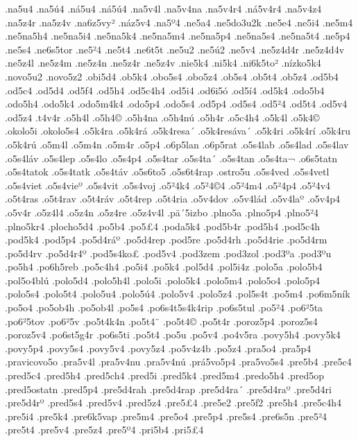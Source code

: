 {.na5u4
.na5^^fa4
.n^^e15u4
.n^^e15^^fa4
.na5v4l
.na5v4na
.na5v4r4
.n^^e15v4r4
.na5v4z4
.na5z4r
.na5z4v
.na6z5vy^^b2
.n^^e1z5v4
.na5^^ba4
.ne5a4
.ne5do3u2k
.ne5e4
.ne5i4
.ne5m4
.ne5na5h4
.ne5na5i4
.ne5na5k4
.ne5na5m4
.ne5na5p4
.ne5na5s4
.ne5na5t4
.ne5p4
.ne5s4
.ne6s5tor
.ne5^^b24
.ne5t4
.ne6t5t
.ne5u2
.ne5^^fa2
.ne5v4
.ne5z4d4r
.ne5z4d4v
.ne5z4l
.ne5z4m
.ne5z4n
.ne5z4r
.ne5z4v
.nie5k4
.ni5k4
.ni6k5to^^b2
.n^^edzko5k4
.novo5u2
.novo5z2
.obi5d4
.ob5k4
.obo5s4
.obo5z4
.ob5s4
.ob5t4
.ob5z4
.od5b4
.od5c4
.od5d4
.od5f4
.od5h4
.od5c4h4
.od5i4
.od6i5^^f3
.od5^^ed4
.od5k4
.odo5b4
.odo5h4
.odo5k4
.odo5m4k4
.odo5p4
.odo5s4
.od5p4
.od5s4
.od5^^b24
.od5t4
.od5v4
.od5z4
.t4v4r
.o5h4l
.o5h4^^a9
.o5h4na
.o5h4n^^fa
.o5h4r
.o5c4h4
.o5k4l
.o5k4^^a9
.okolo5i
.okolo5s4
.o5k4ra
.o5k4r^^e1
.o5k4resa^^b4
.o5k4res^^e1va^^b4
.o5k4ri
.o5k4r^^ed
.o5k4ru
.o5k4r^^fa
.o5m4l
.o5m4n
.o5m4r
.o5p4
.o6p5lan
.o6p5rat
.o5s4lab
.o5s4lad
.o5s4lav
.o5s4l^^e1v
.o5s4lep
.o5s4lo
.o5s4p4
.o5s4tar
.o5s4ta^^b4
.o5s4tan
.o5s4ta^^ac
.o6s5tatn
.o5s4tatok
.o5s4tatk
.o5s4t^^e1v
.o5s6to5
.o5s6t4rap
.ostro5u
.o5s4ved
.o5s4vetl
.o5s4viet
.o5s4vie^^ba
.o5s4vit
.o5s4voj
.o5^^b24k4
.o5^^b24^^a94
.o5^^b24m4
.o5^^b24p4
.o5^^b24v4
.o5t4ras
.o5t4rav
.o5t4r^^e1v
.o5t4rep
.o5t4ria
.o5v4dov
.o5v4l^^e1d
.o5v4la^^ba
.o5v4p4
.o5v4r
.o5z4l4
.o5z4n
.o5z4re
.o5z4v4l
.p^^e4^^b45izbo
.plno5a
.plno5p4
.plno5^^b24
.plno5kr4
.plocho5d4
.po5b4
.po5^^a34
.poda5k4
.pod5b4r
.pod5h4
.pod5c4h
.pod5k4
.pod5p4
.po5d4r^^e1^^ba
.po5d4rep
.pod5re
.po5d4rh
.po5d4rie
.po5d4rm
.po5d4rv
.po5d4r4^^ba
.pod5s4ko^^a3
.pod5v4
.pod3zem
.pod3zol
.pod3^^baa
.pod3^^bau
.po5h4
.po6h5reb
.po5c4h4
.po5i4
.po5k4
.pol5d4
.pol5i4z
.polo5a
.polo5b4
.pol5o4bl^^fa
.polo5d4
.polo5h4l
.polo5i
.polo5k4
.polo5m4
.polo5o4
.polo5p4
.polo5s4
.polo5t4
.polo5u4
.polo5^^fa4
.polo5v4
.polo5z4
.pol5s4t
.po5m4
.po6m5n^^edk
.po5o4
.po5ob4h
.po5ob4l
.po5s4
.po6s4t5s4k4rip
.po6s5tul
.po5^^b24
.po6^^b25ta
.po6^^b25tov
.po6^^b25v
.po5t4k4n
.po5t4^^a8
.po5t4^^a9
.po5t4r
.poroz5p4
.poroz5s4
.poroz5v4
.po6st5g4r
.po6s5ti
.po5t4
.po5u
.po5v4
.po4v5ra
.povy5h4
.povy5k4
.povy5p4
.povy5s4
.povy5v4
.povy5z4
.po5v4z4b
.po5z4
.pra5o4
.pra5p4
.pravicovo5o
.pra5v4l
.pra5v4nu
.pra5v4n^^fa
.pr^^e15vo5p4
.pra5vo5s4
.pre5b4
.pre5c4
.pred5c4
.pred5h4
.pred5ch4
.pred5i
.pred5k4
.pred5m4
.predo5h4
.pred5op
.pred5ostatn
.pred5p4
.pre5d4rah
.pre5d4rap
.pre5d4ra^^b4
.pre5d4ra^^ba
.pre5d4ri
.pre5d4r^^ba
.pred5s4
.pred5v4
.pred5z4
.pre5^^a34
.pre5e2
.pre5f2
.pre5h4
.pre5c4h4
.pre5i4
.pre5k4
.pre6k5vap
.pre5m4
.pre5o4
.pre5p4
.pre5s4
.pre6s5n
.pre5^^b24
.pre5t4
.pre5v4
.pre5z4
.pre5^^ba4
.pri5b4
.pri5^^a34
}
